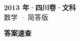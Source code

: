 \documentclass[zihao=-4, a4paper]{ctexart}
\begin{document}
\begin{center}
  {\Large\bfseries 2013 年·四川卷·文科}\\[4pt]
  {\large 数学 · 简答版}
\end{center}
\medskip
{}

\clearpage
{}
\begin{center}{\Large\bfseries 答案速查}\end{center}
\medskip

\end{document}
